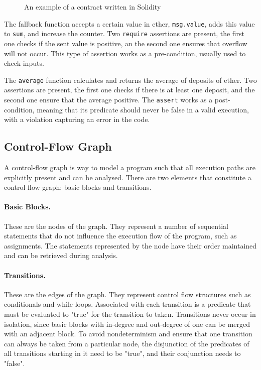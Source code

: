 \begin{figure}

\caption{An example of a contract written in Solidity}
\label{fig:contractC}
\end{figure}

The fallback function accepts a certain value in ether, \texttt{msg.value}, adds this value to \texttt{sum}, and increase the counter. Two \texttt{require} assertions are present, the first one checks if the sent value is positive, an the second one ensures that overflow will not occur. This type of assertion works as a pre-condition, usually used to check inputs.

The \texttt{average} function calculates and returns the average of deposits of ether. Two assertions are present, the first one checks if there is at least one deposit, and the second one ensure that the average positive. The \texttt{assert} works as a post-condition, meaning that its predicate should never be false in a valid execution, with a violation capturing an error in the code.


\subsection{Control-Flow Graph} \label{sec:cfg}

A control-flow graph is way to model a program such that all execution paths are explicitly present and can be analysed. There are two elements that constitute a control-flow graph: basic blocks and transitions.

\paragraph{Basic Blocks.} These are the nodes of the graph. They represent a number of sequential statements that do not influence the execution flow of the program, such as assignments. The statements represented by the node have their order maintained and can be retrieved during analysis.

\paragraph{Transitions.} These are the edges of the graph. They represent control flow structures such as conditionals and while-loops. Associated with each transition is a predicate that must be evaluated to "true" for the transition to taken. Transitions never occur in isolation, since basic blocks with in-degree and out-degree of one can be merged with an adjacent block. To avoid nondeterminism and ensure that one transition can always be taken from a particular node, the disjunction of the predicates of all transitions starting in it need to be "true", and their conjunction needs to "false".

